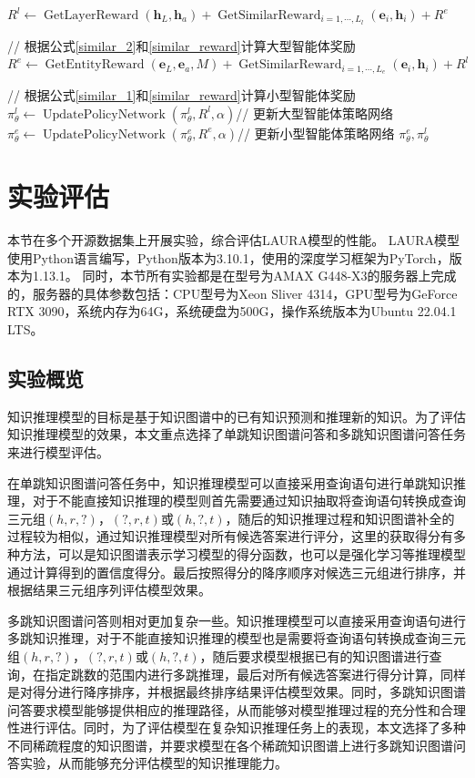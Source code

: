 \documentclass[algorithmlist, AutoFakeBold, AutoFakeSlant, figurelist, tablelist, nomlist, engineering, openany]{seuthesix} %
\begin{document}
\begin{algorithm}[H]
\begin{algorithmic}[1]
  \EndFor
  \State $R^{l} \leftarrow \operatorname{GetLayerReward}(\bm{h}_L, \bm{h}_a) + \operatorname{GetSimilarReward}_{i=1,\cdots,L_l}(\bm{e}_i, \bm{h}_i) + R^{e}$ \par\quad // 根据公式\ref{similar_2}和\ref{similar_reward}计算大型智能体奖励
  \State $R^{e} \leftarrow \operatorname{GetEntityReward}(\bm{e}_L, \bm{e}_a, M) + \operatorname{GetSimilarReward}_{i=1,\cdots,L_e}(\bm{e}_i, \bm{h}_i) + R^{l}$ \par\quad // 根据公式\ref{similar_1}和\ref{similar_reward}计算小型智能体奖励
  \State $\pi_\theta^l \leftarrow \operatorname{UpdatePolicyNetwork}(\pi_\theta^l, R^{l}, \alpha)$// 更新大型智能体策略网络
  \State $\pi_\theta^e \leftarrow \operatorname{UpdatePolicyNetwork}(\pi_\theta^e, R^{e}, \alpha)$// 更新小型智能体策略网络
  \EndFor
  \State \Return $\pi_\theta^e, \pi_\theta^l$
	\end{algorithmic}
\end{algorithm} 

\section{实验评估}
本节在多个开源数据集上开展实验，综合评估LAURA模型的性能。
LAURA模型使用Python语言编写，Python版本为3.10.1，使用的深度学习框架为PyTorch，版本为1.13.1。
同时，本节所有实验都是在型号为AMAX G448-X3的服务器上完成的，服务器的具体参数包括：CPU型号为Xeon Sliver 4314，GPU型号为GeForce RTX 3090，系统内存为64G，系统硬盘为500G，操作系统版本为Ubuntu 22.04.1 LTS。

\subsection{实验概览}
知识推理模型的目标是基于知识图谱中的已有知识预测和推理新的知识。为了评估知识推理模型的效果，本文重点选择了单跳知识图谱问答和多跳知识图谱问答任务来进行模型评估。

在单跳知识图谱问答任务中，知识推理模型可以直接采用查询语句进行单跳知识推理，对于不能直接知识推理的模型则首先需要通过知识抽取将查询语句转换成查询三元组$(h, r, ?)$，$(?, r, t)$或$(h, ?, t)$，随后的知识推理过程和知识图谱补全的过程较为相似，通过知识推理模型对所有候选答案进行评分，这里的获取得分有多种方法，可以是知识图谱表示学习模型的得分函数，也可以是强化学习等推理模型通过计算得到的置信度得分。最后按照得分的降序顺序对候选三元组进行排序，并根据结果三元组序列评估模型效果。

多跳知识图谱问答则相对更加复杂一些。知识推理模型可以直接采用查询语句进行多跳知识推理，对于不能直接知识推理的模型也是需要将查询语句转换成查询三元组$(h, r, ?)$，$(?, r, t)$或$(h, ?, t)$，随后要求模型根据已有的知识图谱进行查询，在指定跳数的范围内进行多跳推理，最后对所有候选答案进行得分计算，同样是对得分进行降序排序，并根据最终排序结果评估模型效果。同时，多跳知识图谱问答要求模型能够提供相应的推理路径，从而能够对模型推理过程的充分性和合理性进行评估。同时，为了评估模型在复杂知识推理任务上的表现，本文选择了多种不同稀疏程度的知识图谱，并要求模型在各个稀疏知识图谱上进行多跳知识图谱问答实验，从而能够充分评估模型的知识推理能力。
\end{document}
